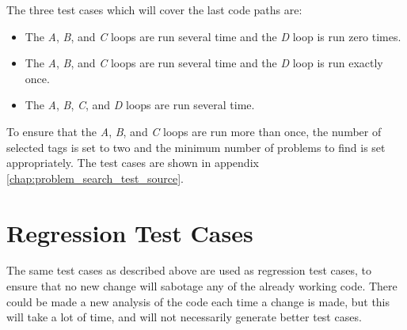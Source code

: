 The three test cases which will cover the last code paths are:
\begin{itemize}
	\item The \textit{A}, \textit{B}, and \textit{C} loops are run several time and the \textit{D} loop is run zero times.
	\item The \textit{A}, \textit{B}, and \textit{C} loops are run several time and the \textit{D} loop is run exactly once.
	\item The \textit{A}, \textit{B}, \textit{C}, and \textit{D} loops are run several time.
\end{itemize}
To ensure that the \textit{A}, \textit{B}, and \textit{C} loops are run more than once, the number of selected tags is set to two and the minimum number of problems to find is set appropriately.
The test cases are shown in appendix \ref{chap:problem_search_test_source}.

\section{Regression Test Cases}
\label{sec:regression_problem_search}
The same test cases as described above are used as regression test cases, to ensure that no new change will sabotage any of the already working code.
There could be made a new analysis of the code each time a change is made, but this will take a lot of time, and will not necessarily generate better test cases.
